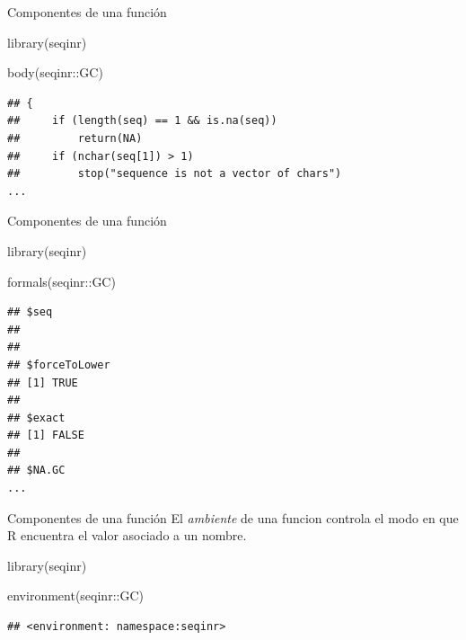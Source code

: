 \documentclass[
  ignorenonframetext,
]{beamer}
\newenvironment{Shaded}{\begin{snugshade}}{\end{snugshade}}
\newcommand{\FunctionTok}[1]{\textcolor[rgb]{0.00,0.00,0.00}{#1}}
\newcommand{\NormalTok}[1]{#1}
\newcommand{\SpecialCharTok}[1]{\textcolor[rgb]{0.00,0.00,0.00}{#1}}
\begin{document}
\begin{frame}[fragile]{Componentes de una función}
\protect\hypertarget{componentes-de-una-funciuxf3n-1}{}
\begin{Shaded}
\begin{Highlighting}[]
\FunctionTok{library}\NormalTok{(seqinr)}

\FunctionTok{body}\NormalTok{(seqinr}\SpecialCharTok{::}\NormalTok{GC)}
\end{Highlighting}
\end{Shaded}

\begin{verbatim}
## {
##     if (length(seq) == 1 && is.na(seq)) 
##         return(NA)
##     if (nchar(seq[1]) > 1) 
##         stop("sequence is not a vector of chars")
...
\end{verbatim}
\end{frame}

\begin{frame}[fragile]{Componentes de una función}
\protect\hypertarget{componentes-de-una-funciuxf3n-2}{}
\begin{Shaded}
\begin{Highlighting}[]
\FunctionTok{library}\NormalTok{(seqinr)}

\FunctionTok{formals}\NormalTok{(seqinr}\SpecialCharTok{::}\NormalTok{GC)}
\end{Highlighting}
\end{Shaded}

\begin{verbatim}
## $seq
## 
## 
## $forceToLower
## [1] TRUE
## 
## $exact
## [1] FALSE
## 
## $NA.GC
...
\end{verbatim}
\end{frame}

\begin{frame}[fragile]{Componentes de una función}
\protect\hypertarget{componentes-de-una-funciuxf3n-3}{}
El \emph{ambiente} de una funcion controla el modo en que R encuentra el
valor asociado a un nombre.

\begin{Shaded}
\begin{Highlighting}[]
\FunctionTok{library}\NormalTok{(seqinr)}

\FunctionTok{environment}\NormalTok{(seqinr}\SpecialCharTok{::}\NormalTok{GC)}
\end{Highlighting}
\end{Shaded}

\begin{verbatim}
## <environment: namespace:seqinr>
\end{verbatim}
\end{frame}
\end{document}
